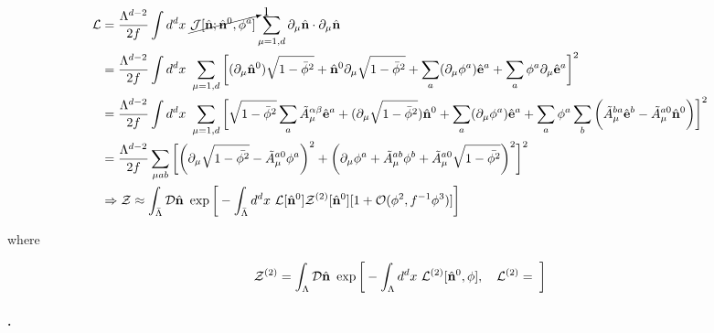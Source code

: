 \begin{itemize}
    \begin{equation}
        \begin{split}
            \mathcal{L}& = \frac{\Lambda^{d-2}}{2f} \int d^d x \textnormal{ } \cancelto{1}{\mathcal{J}[\hat{{\bf n}}; \hat{{\bf n}}^0, \phi^a]}\sum_{\mu = 1,d} \partial_\mu \hat{\bf n} \cdot \partial_\mu \hat{\bf n} \\
            & = \frac{\Lambda^{d-2}}{2f} \int d^d x \textnormal{ } \sum_{\mu = 1,d} \bigg[
                (\partial_\mu \hat{\bf n}^0) \sqrt{1-\bar{\phi}^2} + \hat{\bf n}^{0} \partial_{\mu} \sqrt{1-\bar{\phi}^2}  
                + \sum_{a} (\partial_{\mu} \phi^a) \hat{{\bf e}}^{a} 
                + \sum_{a} \phi^a \partial_{\mu} \hat{{\bf e}}^{a}
            \bigg]^2
            \\
            &= \frac{\Lambda^{d-2}}{2f} \int d^d x \textnormal{ } \sum_{\mu = 1,d} \bigg[
                \sqrt{1-\bar{\phi}^2} \sum_{a} \tilde{A}^{\alpha \beta}_{\mu} \hat{{\bf e}}^{a} 
                + (\partial_\mu \sqrt{1-\bar{\phi}^2} )\hat{{\bf n}}^{0} 
                + \sum_{a} (\partial_{\mu} \phi^a) \hat{{\bf e}}^{a} 
                + \sum_{a} \phi^a \sum_{b} 
                \bigg(
                    \tilde{A}^{b a}_{\mu} \hat{{\bf e}}^{b} 
                    -
                    \tilde{A}^{a 0}_{\mu} \hat{{\bf n}}^{0} 
                \bigg) 
            \bigg]^2
            \\
            &= \frac{\Lambda^{d-2}}{2f} \sum_{\mu ab} \bigg[
                \bigg(
                    \partial_{\mu} \sqrt{1-\bar{\phi^2}} 
                    -
                    \tilde{A}^{a 0}_{\mu} \phi^a
                \bigg)^2
                + 
                \bigg(
                    \partial_{\mu} \phi^a 
                    + 
                    \tilde{A}^{a b}_{\mu} \phi^b 
                    +
                    \tilde{A}^{a 0}_{\mu} \sqrt{1-\bar{\phi^2}}
                \bigg)^2
            \bigg]^2 \\
            & \Rightarrow \mathcal{Z} \approx \int_{\bar{\Lambda}} \mathcal{D} \hat{\bf n} \textnormal{ } \exp 
            \bigg[
                - \int_{\bar{\Lambda}} d^d x \textnormal{ } \mathcal{L}[\hat{{\bf n}}^{0}]
                \mathcal{Z}^{(2)}[\hat{{\bf n}}^{0}] 
                [1 + \mathcal{O}(\phi^2, f^{-1} \phi^3)]
            \bigg]
        \end{split}
    \end{equation}
    
    where 
    
    \begin{equation}
        \mathcal{Z}^{(2)} = \int_{{\Lambda}} \mathcal{D} \hat{\bf n} \textnormal{ } \exp 
        \bigg[
            - \int_{\Lambda} d^d x \textnormal{ } \mathcal{L}^{(2)}[\hat{\bf n}^{0}, \phi], \quad \mathcal{L}^{(2)} = \frac{}{}
        \bigg]
    \end{equation}
    
\end{itemize}

\paragraph{.}
